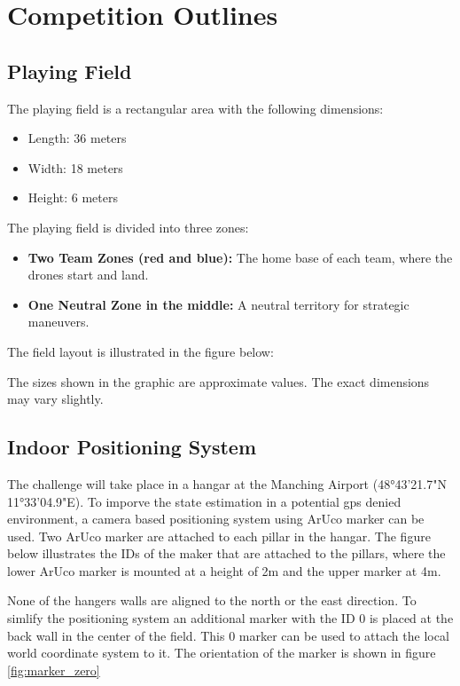 \section{Competition Outlines}

\subsection{Playing Field}

The playing field is a rectangular area with the following dimensions:

\begin{itemize}
	\item Length: 36 meters
	\item Width: 18 meters
	\item Height: 6 meters
\end{itemize}


The playing field is divided into three zones:
\begin{itemize}
	\item \textbf{Two Team Zones (red and blue):} The home base of each team, where the drones start and land.
	\item \textbf{One Neutral Zone in the middle:} A neutral territory for strategic maneuvers.
\end{itemize}

The field layout is illustrated in the figure below:



The sizes shown in the graphic are approximate values. The exact dimensions may vary slightly.

\subsection{Indoor Positioning System}

The challenge will take place in a hangar at the Manching Airport (48°43'21.7"N 11°33'04.9"E).
To imporve the state estimation in a potential gps denied environment, a camera based positioning system using ArUco marker can be used.
Two ArUco marker are attached to each pillar in the hangar.
The figure below illustrates the IDs of the maker that are attached to the pillars, where the lower ArUco marker is mounted at a height of 2m and the upper marker at 4m.



None of the hangers walls are aligned to the north or the east direction.
To simlify the positioning system an additional marker with the ID 0 is placed at the back wall in the center of the field.
This 0 marker can be used to attach the local world coordinate system to it.
The orientation of the marker is shown in figure \ref{fig:marker_zero}

